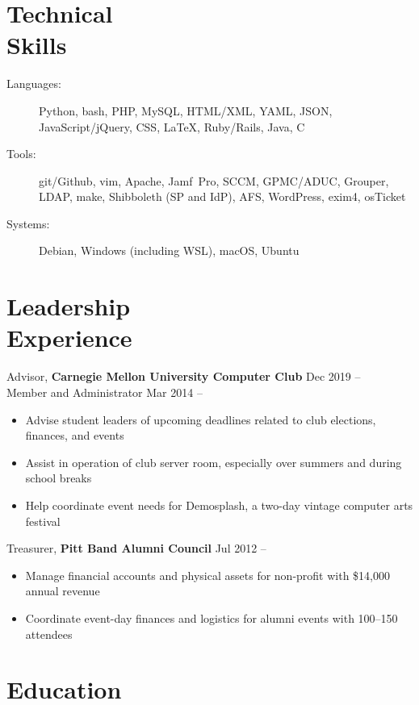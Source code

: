 \documentclass[11pt]{article}
\newcommand{\textdb}[1]{\fontseries{db}\selectfont#1\normalfont}
\newcommand{\present}{\phantom{Xxx 20XX}}
\newcommand{\itemizeonly}{\leavevmode\par\vspace{\dimexpr-\baselineskip-\parskip}}
\begin{document}
\section{Technical\\ Skills}

\itemizeonly
\begin{description}
	\item[\textdb{Languages:}] Python, bash, PHP, MySQL, HTML/XML, YAML, JSON,
		JavaScript/jQuery, CSS, \LaTeX, Ruby/Rails, Java, C
	\item[\textdb{Tools:}] git/Github, vim, Apache,
		Jamf~Pro, SCCM, GPMC/ADUC, Grouper, LDAP, make,
		Shibboleth (SP and IdP), AFS, WordPress, exim4, osTicket
	\item[\textdb{Systems:}] Debian, Windows (including WSL), macOS, Ubuntu
\end{description}



\section{Leadership\\ Experience}

\textdb{
Advisor,
\textbf{Carnegie Mellon University Computer Club}
	\hfill Dec 2019 -- \present \\
}
\textdb{
Member and Administrator
	\hfill Mar 2014 -- \present
}
\begin{itemize}
	\item Advise student leaders of upcoming deadlines
		related to club elections, finances, and events
	\item Assist in operation of club server room,
		especially over summers and during school breaks
	\item Help coordinate event needs for Demosplash,
		a two-day vintage computer arts festival
\end{itemize}

\textdb{
Treasurer,
\textbf{Pitt Band Alumni Council}
	\hfill Jul 2012 -- \present
}
\begin{itemize}
	\item Manage financial accounts and physical assets
		for non-profit with \$14,000 annual revenue
	\item Coordinate event-day finances and logistics for alumni events with 100--150 attendees
\end{itemize}



\section{Education}
\end{document}
